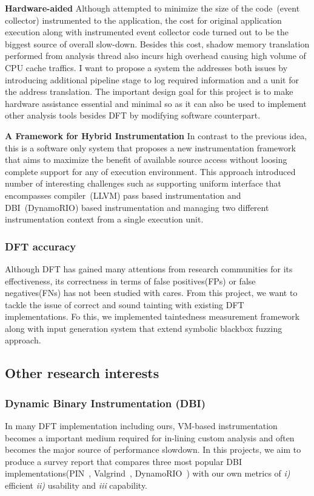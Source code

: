 \documentclass[letterpaper, 10pt]{article}
\begin{document}
\begin{small}
{\bf Hardware-aided \SR} Although \SR attempted to minimize the size of the
code~(event collector) instrumented to the application, the cost for original
application execution along with instrumented event collector code turned out
to be the biggest source of overall slow-down. Besides this cost, shadow memory
translation performed from analysis thread also incurs high overhead causing
high volume of CPU cache traffics. 
%
I want to propose a system the addresses both issues by introducing additional
pipeline stage to log required information and a unit for the address
translation. The important design goal for this project is to make hardware
assistance essential and minimal so as it can also be used to implement other
analysis tools besides DFT by modifying software counterpart.

{\bf A Framework for Hybrid Instrumentation} In contrast to the previous idea,
this is a software only system that proposes a new instrumentation framework
that aims to maximize the benefit of available source access without loosing
complete support for any of execution environment. This approach introduced
number of interesting challenges such as supporting uniform interface that
encompasses compiler~(LLVM) pass based instrumentation and  DBI~(DynamoRIO)
based instrumentation and managing two different instrumentation context from a
single execution unit.  
\subsubsection*{DFT accuracy}
Although DFT has gained many attentions from research communities for its
effectiveness, its correctness in terms of false positives(FPs) or false
negatives(FNs) has not been studied with cares. From this project, we want to
tackle the issue of correct and sound tainting with existing DFT
implementations. Fo this, we implemented taintedness measurement framework
along with input generation system that extend symbolic blackbox fuzzing
approach.

\subsection*{Other research interests} 
%
\subsubsection*{Dynamic Binary
Instrumentation (DBI)} In many DFT implementation including ours, VM-based
instrumentation becomes a important medium required for in-lining custom
analysis and often becomes the major source of performance slowdown. 
%
In this projects, we aim to produce a survey report that compares three most
popular DBI implementations(PIN~\cite{}, Valgrind~\cite{}, DynamoRIO~\cite{})
with our own metrics of {\it i)} efficient {\it ii)} usability and {\it iii}  
capability.


\end{small}
\end{document}
